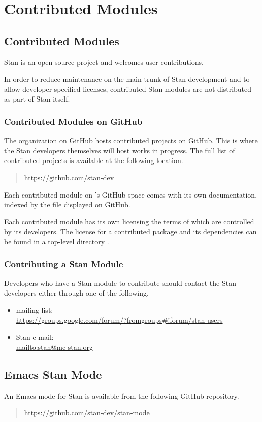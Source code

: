 \part{Contributed Modules}

\chapter{Contributed Modules}

\noindent
Stan is an open-source project and welcomes user contributions.  

In order to reduce maintenance on the main trunk of Stan development
and to allow developer-specified licenses, contributed Stan modules
are not distributed as part of Stan itself.


\section{Contributed Modules on GitHub}

The  organization on GitHub hosts contributed
projects on GitHub.  This is where the Stan developers themselves will
host works in progress.   The full list of contributed projects is
available at the following location.
%
\begin{quote}
\url{https://github.com/stan-dev}
\end{quote}

Each contributed module on 's GitHub space comes with
its own documentation, indexed by the  file displayed
on GitHub.

Each contributed module has its own licensing the terms of which are
controlled by its developers.  The license for a contributed package
and its dependencies can be found in a top-level directory
.

\section{Contributing a Stan Module}

Developers who have a Stan module to contribute should contact the
Stan developers either through one of the following.
%
\begin{itemize}
\item {} mailing list: 
\\
\url{https://groups.google.com/forum/?fromgroups#!forum/stan-users}
\item Stan e-mail: 
\\
\url{mailto:stan@mc-stan.org}
\end{itemize}


\chapter{Emacs Stan Mode}

\noindent
An Emacs mode for Stan is available from the following GitHub repository.

\begin{quote}
\url{https://github.com/stan-dev/stan-mode}
\end{quote}



